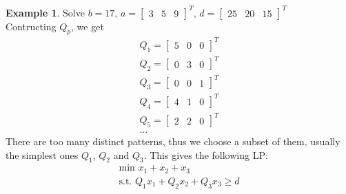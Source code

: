 \documentclass{article}
\theoremstyle{plain}
\theoremstyle{definition}
\newtheorem{eg}{Example}
\begin{document}
\begin{eg}
    Solve $b = 17$, $a = \begin{bmatrix} 3 & 5 & 9\end{bmatrix}^T$,
    $d = \begin{bmatrix} 25 & 20 & 15\end{bmatrix}^T$\\
    Contructing $Q_p$, we get
    \begin{gather*}
        Q_1 = \begin{bmatrix} 5 & 0 & 0 \end{bmatrix}^T\\
        Q_2 = \begin{bmatrix} 0 & 3 & 0 \end{bmatrix}^T\\
        Q_3 = \begin{bmatrix} 0 & 0 & 1 \end{bmatrix}^T\\
        Q_4 = \begin{bmatrix} 4 & 1 & 0 \end{bmatrix}^T\\
        Q_5 = \begin{bmatrix} 2 & 2 & 0 \end{bmatrix}^T\\
            ...
    \end{gather*}
    There are too many distinct patterns, thus we choose a subset of them, usually
    the simplest ones $Q_1$, $Q_2$ and $Q_3$. This gives the following LP:
    \begin{gather*}
        \text{min } x_1 + x_2 + x_3\\
        \text{s.t. } Q_1x_1 + Q_2x_2 + Q_3x_3 \geq d
    \end{gather*}


\end{eg}
\end{document}
